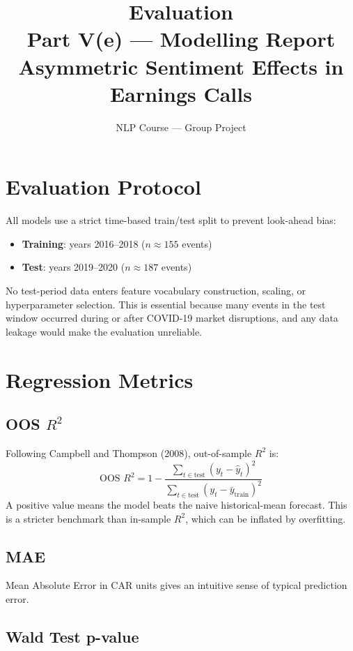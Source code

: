 \documentclass[12pt,a4paper]{article}
\title{\textbf{Evaluation}\\[0.3em]
\large Part V(e) --- Modelling Report\\
Asymmetric Sentiment Effects in Earnings Calls}
\author{NLP Course --- Group Project}
\date{}
\begin{document}
\maketitle

\section{Evaluation Protocol}

All models use a strict time-based train/test split to prevent look-ahead bias:

\begin{itemize}
  \item \textbf{Training}: years 2016--2018 ($n \approx 155$ events)
  \item \textbf{Test}: years 2019--2020 ($n \approx 187$ events)
\end{itemize}

No test-period data enters feature vocabulary construction, scaling, or
hyperparameter selection.  This is essential because many events in the test window
occurred during or after COVID-19 market disruptions, and any data leakage would
make the evaluation unreliable.

\section{Regression Metrics}

\subsection{OOS $R^2$}

Following Campbell and Thompson (2008), out-of-sample $R^2$ is:
\[
  \text{OOS }R^2 = 1 - \frac{\sum_{t \in \text{test}} (y_t - \hat{y}_t)^2}
                              {\sum_{t \in \text{test}} (y_t - \bar{y}_{\text{train}})^2}
\]
A positive value means the model beats the naive historical-mean forecast.
This is a stricter benchmark than in-sample $R^2$, which can be inflated by overfitting.

\subsection{MAE}

Mean Absolute Error in CAR units gives an intuitive sense of typical prediction error.

\subsection{Wald Test p-value}
\end{document}
